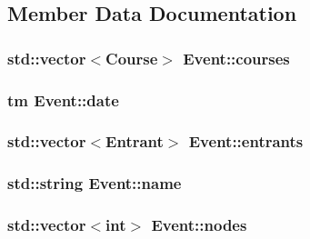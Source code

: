 \subsection{\-Member \-Data \-Documentation}
\hypertarget{classEvent_a54f5b521beee9f8714ac33e304c948b0}{
\subsubsection[{courses}]{\setlength{\rightskip}{0pt plus 5cm}std\-::vector$<${\bf \-Course}$>$ {\bf \-Event\-::courses}}}\label{classEvent_a54f5b521beee9f8714ac33e304c948b0}
\hypertarget{classEvent_a5df9ecce46e9db33b3b29b99156aa70a}{
\subsubsection[{date}]{\setlength{\rightskip}{0pt plus 5cm}tm {\bf \-Event\-::date}}}\label{classEvent_a5df9ecce46e9db33b3b29b99156aa70a}
\hypertarget{classEvent_adede353249fa65a02148e7fcce077449}{
\subsubsection[{entrants}]{\setlength{\rightskip}{0pt plus 5cm}std\-::vector$<${\bf \-Entrant}$>$ {\bf \-Event\-::entrants}}}\label{classEvent_adede353249fa65a02148e7fcce077449}
\hypertarget{classEvent_ae116bf76fb01a92e000579a5a0d6f35c}{
\subsubsection[{name}]{\setlength{\rightskip}{0pt plus 5cm}std\-::string {\bf \-Event\-::name}}}\label{classEvent_ae116bf76fb01a92e000579a5a0d6f35c}
\hypertarget{classEvent_a2b330c8081c3c907a02daa7da8043fc6}{
\subsubsection[{nodes}]{\setlength{\rightskip}{0pt plus 5cm}std\-::vector$<$int$>$ {\bf \-Event\-::nodes}}}\label{classEvent_a2b330c8081c3c907a02daa7da8043fc6}
